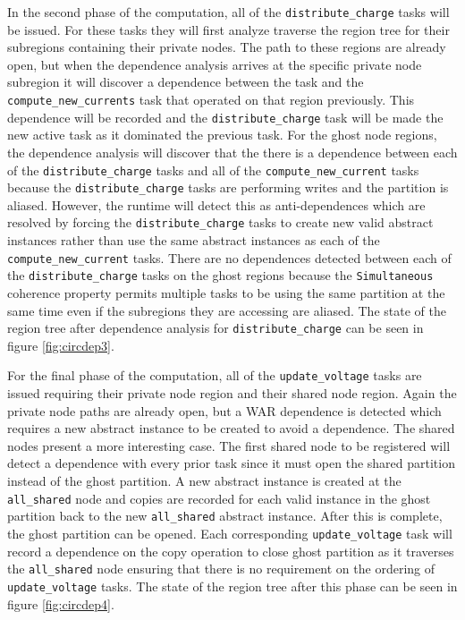 In the second phase of the computation, all of the {\tt distribute\_charge} tasks
will be issued.  For these tasks they will first analyze traverse the region tree
for their subregions containing their private nodes.  The path to these regions are
already open, but when the dependence analysis arrives at the specific private node subregion it will
discover a dependence between the task and the {\tt compute\_new\_currents} task that operated
on that region previously.  This dependence will be recorded and the 
{\tt distribute\_charge} task will be made the new active task as it dominated the
previous task.  For the ghost node regions, the dependence analysis will discover that the
there is a dependence between each of the {\tt distribute\_charge} tasks and all of the
{\tt compute\_new\_current} tasks because the {\tt distribute\_charge} tasks are
performing writes and the partition is aliased.  However, the runtime will detect this as
anti-dependences which are resolved by forcing the {\tt distribute\_charge} tasks to
create new valid abstract instances rather than use the same abstract instances as
each of the {\tt compute\_new\_current} tasks.  There are no dependences detected
between each of the {\tt distribute\_charge} tasks on the ghost regions because
the {\tt Simultaneous} coherence property permits multiple tasks to be using the same
partition at the same time even if the subregions they are accessing are aliased.  The
state of the region tree after dependence analysis for {\tt distribute\_charge} can
be seen in figure \ref{fig:circdep3}.

For the final phase of the computation, all of the {\tt update\_voltage} tasks
are issued requiring their private node region and their shared node region.  Again
the private node paths are already open, but a WAR dependence is detected which
requires a new abstract instance to be created to avoid a dependence.  The
shared nodes present a more interesting case.  The first shared node to be registered
will detect a dependence with every prior task since it must open the shared partition
instead of the ghost partition.  A new abstract instance is created at the 
{\tt all\_shared} node and copies are recorded for each valid instance in the ghost partition
back to the new {\tt all\_shared} abstract instance.  After this is complete, the
ghost partition can be opened.  Each corresponding {\tt update\_voltage} task will record
a dependence on the copy operation to close ghost partition as it traverses the {\tt all\_shared}
node ensuring that there is no requirement on the ordering of {\tt update\_voltage}
tasks.  The state of the region tree after this phase can be seen in figure \ref{fig:circdep4}.

